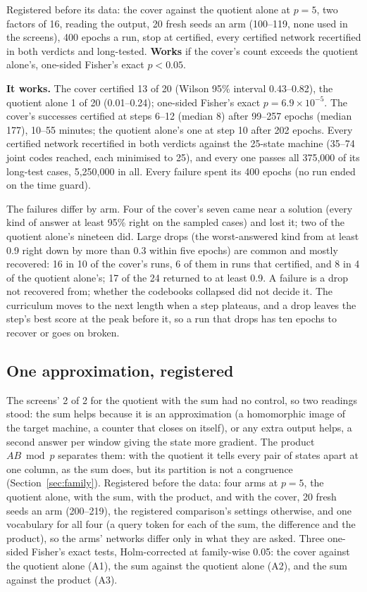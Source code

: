 \documentclass[11pt]{article}
\begin{document}
Registered before its data: the cover against the quotient alone at $p = 5$, two factors of 16,
reading the output, 20 fresh seeds an arm (100--119, none used in the screens), 400 epochs a run,
stop at certified, every certified network recertified in both verdicts and long-tested.
\textbf{Works} if the cover's count exceeds the quotient alone's, one-sided Fisher's exact
$p < 0.05$.

\textbf{It works.} The cover certified 13 of 20 (Wilson 95\% interval 0.43--0.82), the quotient
alone 1 of 20 (0.01--0.24); one-sided Fisher's exact $p = 6.9 \times 10^{-5}$. The cover's
successes certified at steps 6--12 (median 8) after 99--257 epochs (median 177), 10--55 minutes;
the quotient alone's one at step 10 after 202 epochs. Every certified network recertified in both
verdicts against the 25-state machine (35--74 joint codes reached, each minimised to 25), and every
one passes all 375{,}000 of its long-test cases, 5{,}250{,}000 in all. Every failure spent its 400
epochs (no run ended on the time guard).

The failures differ by arm. Four of the cover's seven came near a solution (every kind of answer at
least 95\% right on the sampled cases) and lost it; two of the quotient alone's nineteen did.
Large drops (the worst-answered kind from at least 0.9 right down by more than 0.3 within five
epochs) are common
and mostly recovered: 16 in 10 of the cover's runs, 6 of them in runs that certified, and 8 in 4 of
the quotient alone's; 17 of the 24 returned to at least 0.9. A failure is a drop not recovered from;
whether the codebooks collapsed did not decide it. The curriculum moves to the next length when a
step plateaus, and a drop leaves the step's best score at the peak before it, so a run that drops
has ten epochs to recover or goes on broken.

\subsection{One approximation, registered}
\label{sec:approximation}

The screens' 2 of 2 for the quotient with the sum had no control, so two readings stood: the sum
helps because it is an approximation (a homomorphic image of the target machine, a counter that
closes on itself), or any extra output helps, a second answer per window giving the state more
gradient. The product $A B \bmod p$ separates them: with the quotient it tells every pair of states
apart at one column, as the sum does, but its partition is not a congruence (Section~\ref{sec:family}).
Registered before the data: four arms at $p = 5$, the quotient alone, with the sum, with the
product, and with the cover, 20 fresh seeds an arm (200--219), the registered comparison's settings
otherwise, and one vocabulary for all four (a query token for each of the sum, the difference and
the product), so the arms' networks differ only in what they are asked. Three one-sided Fisher's
exact tests, Holm-corrected at family-wise 0.05: the cover against the quotient alone (A1), the sum
against the quotient alone (A2), and the sum against the product (A3).
\end{document}
